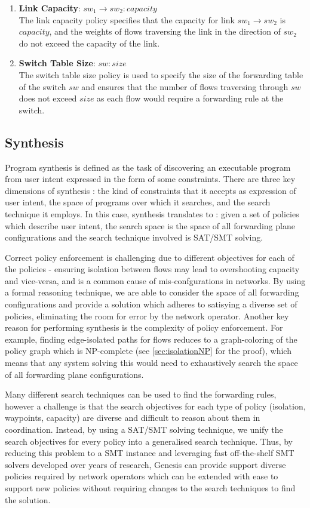 \documentclass[]{sig}
\begin{document}
\begin{enumerate}
	\item \textbf{Link Capacity}: $sw_1 \rightarrow sw_2 : capacity$ \\
	The link capacity policy specifies that the capacity for link $sw_1 \rightarrow sw_2$ is $capacity$, and the weights of flows traversing the link in the direction of $sw_2$ do not exceed the capacity of the link.  
	\item \textbf{Switch Table Size}: $sw : size$ \\
	The switch table size policy is used to specify the size of the forwarding table of the switch $sw$ and ensures that the number of flows traversing through $sw$ does not exceed $size$ as each flow would require a forwarding rule at the switch.
\end{enumerate}
\subsection{Synthesis} \label{sec:synthesis}
Program synthesis is defined as the task of discovering an executable program from user intent expressed in the form of some constraints. There are three key dimensions of synthesis : the kind of constraints that it accepts as expression of user intent, the space of programs over which it searches, and the search technique it employs. In this case, synthesis translates to : given a set of policies which describe user intent, the search space is the space of all forwarding plane configurations and the search technique involved is SAT/SMT solving. 

Correct policy enforcement is challenging due to different objectives for each of the policies - ensuring isolation between flows may lead to overshooting capacity and vice-versa, and is a common cause of mis-confgurations in networks. By using a formal reasoning technique, we are able to consider the space of all forwarding configurations and provide a solution which adheres to satisying a diverse set of policies, eliminating the room for error by the network operator. Another key reason for performing synthesis is the complexity of policy enforcement. For example, finding edge-isolated paths for flows  reduces to a graph-coloring of the policy graph which is NP-complete (see \cref{sec:isolationNP} for the proof), which means that any system solving this would need to exhaustively search the space of all forwarding plane configurations. 

Many different search techniques can be used to find the forwarding rules, however a challenge is that the search objectives for each type of policy (isolation, waypoints, capacity) are diverse and difficult to reason about them in coordination. Instead, by using a SAT/SMT solving technique, we unify the search objectives for every policy into a generalised search technique. Thus, by reducing this problem to a SMT instance and leveraging fast off-the-shelf SMT solvers developed over years of research, Genesis can provide support diverse policies required by network operators which can be extended with ease to support new policies without requiring changes to the search techniques to find the solution. 
\end{document}
